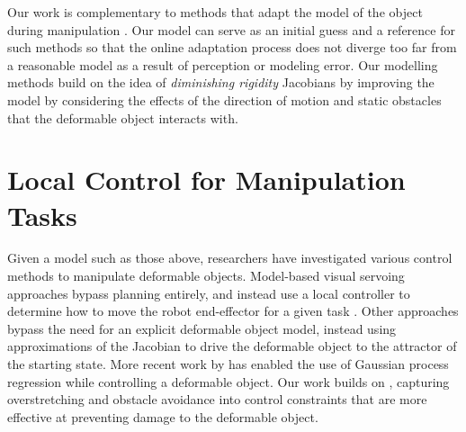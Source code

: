 Our work is complementary to methods that adapt the model of the object during manipulation \cite{Navarro-Alarcon2014, NavarroAlarcon2018, Hu2018deformable_gpr}. Our model can serve as an initial guess and a reference for such methods so that the online adaptation process does not diverge too far from a reasonable model as a result of perception or modeling error. Our modelling methods build on the idea of \textit{diminishing rigidity} Jacobians \cite{Berenson2013} by improving the model by considering the effects of the direction of motion and static obstacles that the deformable object interacts with.


\section{Local Control for Manipulation Tasks}


Given a model such as those above, researchers have investigated various control methods to manipulate deformable objects. Model-based visual servoing approaches bypass planning entirely, and instead use a local controller to determine how to move the robot end-effector for a given task \cite{Hirai2000, Wada2001, Smolen2009}. Other approaches \cite{Berenson2013, Navarro-Alarcon2014, NavarroAlarcon2016, NavarroAlarcon2018} bypass the need for an explicit deformable object model, instead using approximations of the Jacobian to drive the deformable object to the attractor of the starting state. More recent work by \citet{Hu2018deformable_gpr} has enabled the use of Gaussian process regression while controlling a deformable object. Our work builds on \citet{Berenson2013}, capturing overstretching and obstacle avoidance into control constraints that are more effective at preventing damage to the deformable object.



